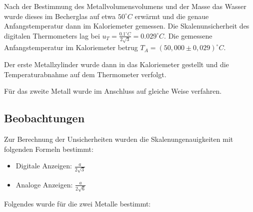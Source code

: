 \documentclass[
  9pt,
]{article}
\begin{document}
Nach der Bestimmung des Metallvolumensvolumens und der Masse das Wasser
wurde dieses im Becherglas auf etwa \(50^\circ C\) erwärmt und die
genaue Anfangstemperatur dann im Kaloriemeter gemessen. Die
Skalenunsicherheit des digitalen Thermometers lag bei
\(u_T = \frac{0.1^\circ C}{2\sqrt{3}} = 0.029^\circ C\). Die gemessene
Anfangstemperatur im Kaloriemeter betrug
\(T_A=(50,000\pm 0,029)^\circ C\).

Der erste Metallzylinder wurde dann in das Kaloriemeter gestellt und die
Temperaturabnahme auf dem Thermometer verfolgt.

Für das zweite Metall wurde im Anschluss auf gleiche Weise verfahren.

\hypertarget{beobachtungen-1}{%
\subsection{Beobachtungen}\label{beobachtungen-1}}

Zur Berechnung der Unsicherheiten wurden die Skalenungenauigkeiten mit
folgenden Formeln bestimmt:

\begin{itemize}
  \item Digitale Anzeigen: $\frac{a}{2\sqrt{3}}$
  \item Analoge Anzeigen: $\frac{a}{2\sqrt{6}}$
\end{itemize}

Folgendes wurde für die zwei Metalle bestimmt:
\end{document}
